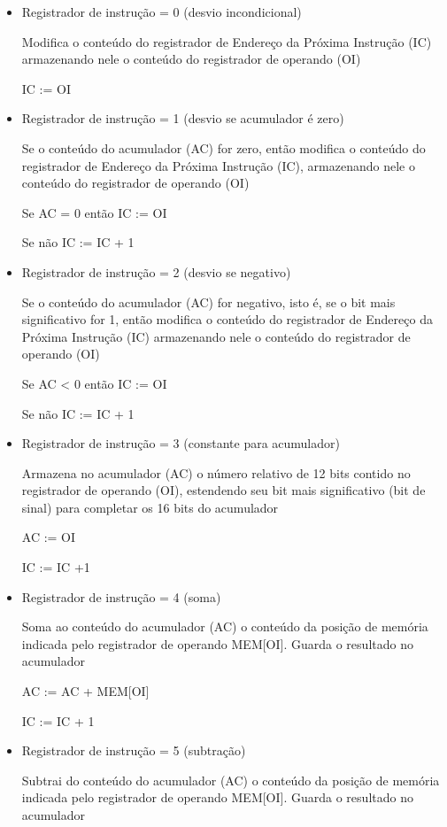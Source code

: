 \begin{itemize}
	\item Registrador de instrução = 0 (desvio incondicional)

	Modifica o conteúdo do registrador de Endereço da Próxima Instrução (IC) armazenando nele o conteúdo do registrador de operando (OI)

	IC := OI

	\item Registrador de instrução = 1 (desvio se acumulador é zero)

	Se o conteúdo do acumulador (AC) for zero, então modifica o conteúdo do registrador de Endereço da Próxima Instrução (IC), armazenando nele o conteúdo do registrador de operando (OI) 

	Se AC = 0 então IC := OI 
	
	Se não IC := IC + 1 

	\item Registrador de instrução = 2 (desvio se negativo)

	Se o conteúdo do acumulador (AC) for negativo, isto é, se o bit mais significativo for 1, então modifica o conteúdo do registrador de Endereço da Próxima Instrução (IC) armazenando nele o conteúdo do registrador de operando (OI)

	Se AC < 0 então IC := OI 
	
	Se não IC := IC + 1

	\item Registrador de instrução = 3 (constante para acumulador)

	Armazena no acumulador (AC) o número relativo de 12 bits contido no registrador de operando (OI), estendendo seu bit mais significativo (bit de sinal) para completar os 16 bits do acumulador
		
	AC := OI 
	
	IC := IC +1 

	\item Registrador de instrução = 4 (soma)

	Soma ao conteúdo do acumulador (AC) o conteúdo da posição de memória indicada pelo registrador de operando MEM[OI]. Guarda o resultado no acumulador

	AC := AC + MEM[OI] 

	IC := IC + 1

	\item Registrador de instrução = 5 (subtração)

	Subtrai do conteúdo do acumulador (AC) o conteúdo da posição de memória indicada pelo registrador de operando MEM[OI]. Guarda o resultado no acumulador


\end{itemize}
